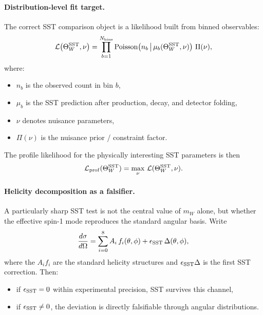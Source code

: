 \documentclass[11pt]{article}
\theoremstyle{definition}
\theoremstyle{plain}
\theoremstyle{remark}
\begin{document}
        \paragraph{Distribution-level fit target.}
            The correct SST comparison object is a likelihood built from binned observables:
            \begin{equation}
                \mathcal{L}\bigl(\Theta_W^{\rm SST},\nu\bigr)
                =
                \prod_{b=1}^{N_{\rm bins}}
                    {\rm Poisson}\!\left(
                                       n_b \,\middle|\, \mu_b(\Theta_W^{\rm SST},\nu)
                \right)
                \,
                \Pi(\nu),
                \label{eq:sst-likelihood}
            \end{equation}
            where:
            \begin{itemize}
                \item $n_b$ is the observed count in bin $b$,
                \item $\mu_b$ is the SST prediction after production, decay, and detector folding,
                \item $\nu$ denotes nuisance parameters,
                \item $\Pi(\nu)$ is the nuisance prior / constraint factor.
            \end{itemize}
            The profile likelihood for the physically interesting SST parameters is then
            \begin{equation}
                \mathcal{L}_{\rm prof}(\Theta_W^{\rm SST})
                =
                \max_{\nu}\,
                \mathcal{L}(\Theta_W^{\rm SST},\nu).
                \label{eq:profile-like}
            \end{equation}
    
        \paragraph{Helicity decomposition as a falsifier.}
            A particularly sharp SST test is not the central value of $m_W$ alone, but whether the effective spin-1 mode reproduces the standard angular basis. Write
            \begin{equation}
                \frac{d\sigma}{d\Omega}
                =
                \sum_{i=0}^{8} A_i\, f_i(\theta,\phi)
                +
                \epsilon_{\rm SST}\,\Delta(\theta,\phi),
                \label{eq:helicity-decomp-sst}
            \end{equation}
            where the $A_i f_i$ are the standard helicity structures and $\epsilon_{\rm SST}\Delta$ is the first SST correction. Then:
            \begin{itemize}
                \item if $\epsilon_{\rm SST}=0$ within experimental precision, SST survives this channel,
                \item if $\epsilon_{\rm SST}\neq 0$, the deviation is directly falsifiable through angular distributions.
            \end{itemize}
    
\end{document}
